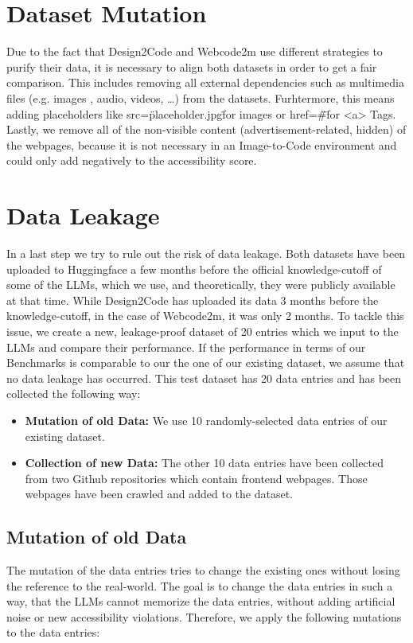 \section{Dataset Mutation}
Due to the fact that Design2Code and Webcode2m use different strategies to purify
their data, it is necessary to align both datasets in order to get a fair comparison.
This includes removing all external dependencies such as multimedia files (e.g. images
, audio, videos, {\ldots}) from the datasets. Furhtermore, this means adding 
placeholders like src=\"placeholder.jpg\" for images or href=\"\#\" for <a> Tags.
Lastly, we remove all of the non-visible content (advertisement-related, hidden) 
of the webpages, because it is not necessary in an Image-to-Code environment and 
could only add negatively to the accessibility score.


\section{Data Leakage}
In a last step we try to rule out the risk of data leakage. Both datasets have been
uploaded to Huggingface a few months before the official knowledge-cutoff of some of the LLMs, which
we use, and theoretically, they were publicly available at that time. 
While Design2Code has uploaded its data 3 months before the knowledge-cutoff, in the 
case of Webcode2m, it was only 2 months. To tackle this issue, we create a 
new, leakage-proof dataset of 20 entries which we input to the LLMs and compare their 
performance. If the performance in terms of our Benchmarks is comparable to our the one 
of our existing dataset, we assume that no data leakage has occurred.\newline
This test dataset has 20 data entries and has been collected the following way:

\begin{itemize}
  \item \textbf{Mutation of old Data:} We use 10 randomly-selected data entries of our existing 
  dataset. 
  \item \textbf{Collection of new Data:} The other 10 data entries have been collected from 
  two Github repositories which contain frontend webpages. Those webpages have been crawled 
  and added to the dataset.
\end{itemize}

\subsection{Mutation of old Data}
The mutation of the data entries tries to change the existing ones without losing the 
reference to the real-world. The goal is to change the data entries in such a way, that
the LLMs cannot memorize the data entries, without adding artificial noise or new 
accessibility violations. Therefore, we apply the following mutations to the data entries:

